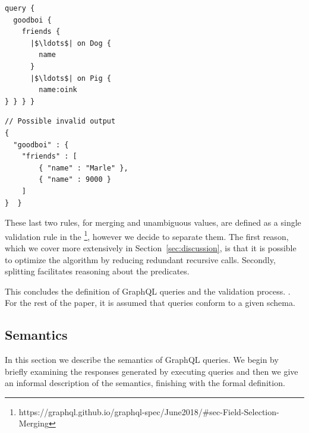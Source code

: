 \begin{minipage}[t]{.22\textwidth}
\begin{verbatim}
query {
  goodboi {
    friends {
      |$\ldots$| on Dog {
        name
      }
      |$\ldots$| on Pig {
        name:oink
} } } }
\end{verbatim}
\end{minipage}%
\begin{minipage}[t]{.22\textwidth}
\begin{verbatim}
// Possible invalid output
{
  "goodboi" : {
    "friends" : [
        { "name" : "Marle" },
        { "name" : 9000 }
    ]
}  }
\end{verbatim}
\end{minipage}



				
These last two rules, for merging and unambiguous values, are defined as a single validation rule in the \spec{}\footnote{https://graphql.github.io/graphql-spec/June2018/\#sec-Field-Selection-Merging}, however we decide to separate them. The first reason, which we cover more extensively in Section~\ref{sec:discussion}, is that it is possible to optimize the algorithm by reducing redundant recursive calls. Secondly, splitting facilitates reasoning about the predicates.



This concludes the definition of GraphQL queries and the validation process. . For the rest of the paper, it is assumed that queries conform to a given schema. 

\subsection{Semantics}\label{subsec:semantics}

In this section we describe the semantics of GraphQL queries. We begin by briefly examining the responses generated by executing queries and then we give an informal description of the semantics, finishing with the formal definition. %

